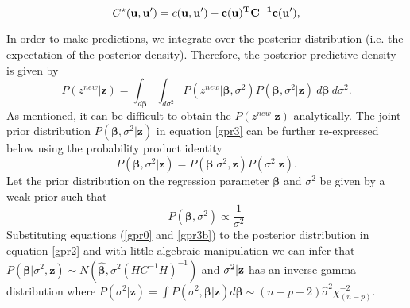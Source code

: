 $$ C^{\star}(\mathbf{u,u'})=c(\mathbf{u,u'})-\bf c(\mathbf{u})^T C^{-1}c(\mathbf{u'}),$$ 

In order to make predictions, we integrate over the posterior distribution (i.e. the expectation of the posterior density). Therefore, the posterior predictive density is given by
\begin{equation}\tag{A.5}\label{gpr3}
P(z^{new}|\mathbf{z})=\int_{d\boldsymbol\beta}\int_{d\sigma^2} P(z^{new}|\boldsymbol\beta,\sigma^2) P(\boldsymbol\beta,\sigma^2|\mathbf{z})~ d\boldsymbol\beta ~d\sigma^2.
\end{equation}
As mentioned, it can be difficult to obtain the $P(z^{new}|\mathbf{z})$ analytically. %
The joint prior distribution $P(\boldsymbol\beta,\sigma^2|\mathbf{z})$ in equation \ref{gpr3} can be further re-expressed below using the probability product identity
\begin{equation*}
P(\boldsymbol\beta,\sigma^2|\mathbf{z})=P(\boldsymbol\beta|\sigma^2,\mathbf{z}) P(\sigma^2|\mathbf{z}).
\end{equation*}
Let the prior distribution on the regression parameter $\boldsymbol\beta$ and $\sigma^2$ be given by a weak prior such that
\begin{equation}\tag{A.6}\label{gpr3b}
P(\boldsymbol\beta, \sigma^2) \propto \frac{1}{\sigma^2}
\end{equation}
Substituting equations (\ref{gpr0} and \ref{gpr3b}) to the posterior distribution in equation \ref{gpr2} and with little algebraic manipulation we can infer that $P(\boldsymbol\beta|\sigma^2,\mathbf{z})\sim N(\boldsymbol{\hat\beta},\sigma^2 (HC^{-1}H)^{-1})$ and $\sigma^{2}|\bf z$ has an inverse-gamma distribution where $P(\sigma^{2}|\mathbf{z})=\int P(\sigma^2, \boldsymbol\beta|\mathbf{z})d\boldsymbol{\beta}\sim (n-p-2)\hat \sigma^2\chi_{(n-p)}^{-2}$.
